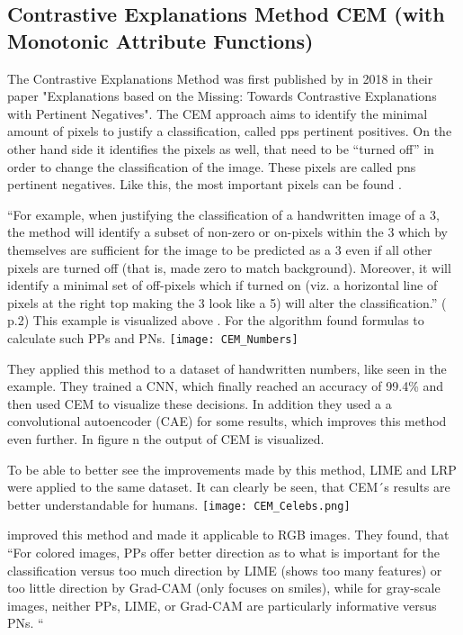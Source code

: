 \subsection{Contrastive Explanations Method CEM (with Monotonic Attribute Functions)}
The Contrastive Explanations Method was first published by  in 2018 in their paper "Explanations based on the Missing: Towards Contrastive Explanations with Pertinent Negatives".
The CEM approach aims to identify the minimal amount of pixels to justify a classification, called \glspl{pp} pertinent positives. On the other hand side it identifies the pixels as well, that need to be “turned off” in order to change the classification of the image. These pixels are called \glspl{pn} pertinent negatives. Like this, the most important pixels can be found . 
\par
“For example, when justifying the classification of a handwritten image of a 3, the method will identify a subset of non-zero or on-pixels within the 3 which by themselves are sufficient for the image to be predicted as a 3 even if all other pixels are turned off (that is, made zero to match background). Moreover, it will identify a minimal set of off-pixels which if turned on (viz. a horizontal line of pixels at the right top making the 3 look like a 5) will alter the classification.” ( p.2)
This example is visualized above .
For the algorithm  found formulas to calculate such PPs and PNs.
\texttt{[image: CEM\_Numbers]}

They applied this method to a dataset of handwritten numbers, like seen in the example. They trained a CNN, which finally reached an accuracy of 99.4\% and then used CEM to visualize these decisions. In addition they used a a convolutional autoencoder (CAE) for some results, which improves this method even further. In figure n the output of CEM is visualized. 
\par
To be able to better see the improvements made by this method, LIME and LRP were applied to the same dataset. It can clearly be seen, that CEM´s results are better understandable for humans.
\texttt{[image: CEM\_Celebs.png]}

 improved this method and made it applicable to RGB images.
They found, that “For colored images, PPs offer better direction as to what is important for the classification versus too much direction by LIME (shows too many features) or too little direction by Grad-CAM (only focuses on smiles), while for gray-scale images, neither PPs, LIME, or Grad-CAM are particularly informative versus PNs. “ 

